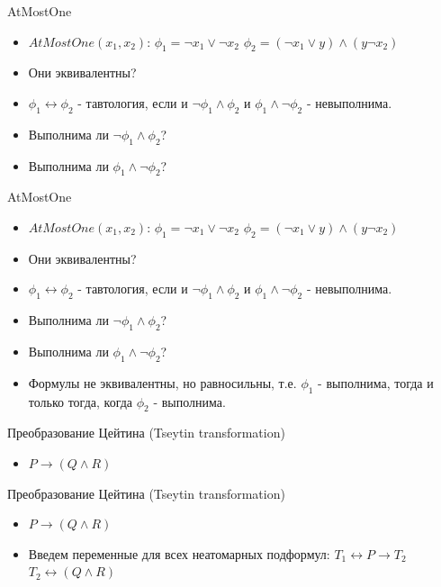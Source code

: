\documentclass{beamer}
\begin{document}
\begin{frame}{AtMostOne}
\begin{itemize}
\item $AtMostOne(x_1, x_2)$:\newline
$\phi_1 = \lnot x_1 \vee \lnot x_2$\newline
$\phi_2 = (\lnot x_1 \vee y) \wedge (y \lnot x_2)$\newline
\item Они эквивалентны?
\item $\phi_1 \leftrightarrow \phi_2$ - тавтология, если и $\lnot \phi_1 \wedge \phi_2$ и $\phi_1 \wedge \lnot \phi_2$ -
невыполнима.
\item Выполнима ли $\lnot \phi_1 \wedge \phi_2$?
\item Выполнима ли $\phi_1 \wedge \lnot \phi_2$?
\end{itemize}
\end{frame}

\begin{frame}{AtMostOne}
\begin{itemize}
\item $AtMostOne(x_1, x_2)$:\newline
$\phi_1 = \lnot x_1 \vee \lnot x_2$\newline
$\phi_2 = (\lnot x_1 \vee y) \wedge (y \lnot x_2)$\newline
\item Они эквивалентны?
\item $\phi_1 \leftrightarrow \phi_2$ - тавтология, если и $\lnot \phi_1 \wedge \phi_2$ и $\phi_1 \wedge \lnot \phi_2$ -
невыполнима.
\item Выполнима ли $\lnot \phi_1 \wedge \phi_2$?
\item Выполнима ли $\phi_1 \wedge \lnot \phi_2$?
\item Формулы не эквивалентны, но равносильны, т.е. $\phi_1$ - выполнима, тогда и только тогда, когда $\phi_2$ - выполнима.
\end{itemize}
\end{frame}

\begin{frame}{Преобразование Цейтина (Tseytin transformation)}
\begin{itemize}
\item $P \rightarrow (Q \wedge R)$
\end{itemize}
\end{frame}

\begin{frame}{Преобразование Цейтина (Tseytin transformation)}
\begin{itemize}
\item $P \rightarrow (Q \wedge R)$
\item Введем переменные для всех неатомарных подформул:\newline
$T_1 \leftrightarrow P \rightarrow T_2$\newline
$T_2 \leftrightarrow (Q \wedge R)$\newline
\end{itemize}
\end{frame}
\end{document}
